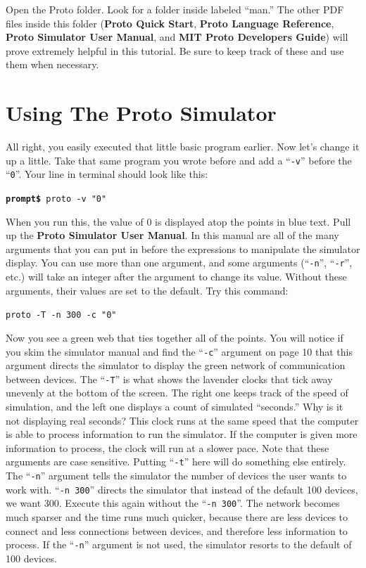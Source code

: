 \documentclass{article}
\newcommand\code[1]{\begin{center}\var{#1}\end{center}}
\newcommand\var[1]{{\tt #1}}
\newcommand\qvar[1]{``{\tt #1}''}
\begin{document}
Open the Proto folder.  Look for a folder inside labeled ``man.''  The
other PDF files inside this folder ({\bf Proto Quick Start}, {\bf
  Proto Language Reference}, {\bf Proto Simulator User Manual}, and
{\bf MIT Proto Developers Guide}) will prove extremely helpful in this
tutorial.  Be sure to keep track of these and use them when necessary.


\section{Using The Proto Simulator}

All right, you easily executed that little basic program earlier.  Now
let's change it up a little.  Take that same program you wrote before
and add a \qvar{-v} before the \qvar{0}.  Your line in terminal should
look like this:

\code{{\bf prompt\$} proto -v "0"}

When you run this, the value of 0 is displayed atop the points in blue
text.  Pull up the {\bf Proto Simulator User Manual}. In this manual
are all of the many arguments that you can put in before the
expressions to manipulate the simulator display.  You can use more
than one argument, and some arguments (\qvar{-n}, \qvar{-r}, etc.) will
take an integer after the argument to change its value.  Without these
arguments, their values are set to the default.  Try this command:

\code{proto -T -n 300 -c "0"}

Now you see a green web that ties together all of the points. You will
notice if you skim the simulator manual and find the \qvar{-c}
argument on page 10 that this argument directs the simulator to
display the green network of communication between devices.  The
\qvar{-T} is what shows the lavender clocks that tick away unevenly at
the bottom of the screen.  The right one keeps track of the speed of
simulation, and the left one displays a count of simulated
``seconds.''  Why is it not displaying real seconds?  This clock runs
at the same speed that the computer is able to process information to
run the simulator.  If the computer is given more information to
process, the clock will run at a slower pace.  Note that these
arguments are case sensitive.  Putting \qvar{-t} here will do
something else entirely.  The \qvar{-n} argument tells the simulator
the number of devices the user wants to work with. \qvar{-n 300}
directs the simulator that instead of the default 100 devices, we want
300.  Execute this again without the \qvar{-n 300}.  The network
becomes much sparser and the time runs much quicker, because there are
less devices to connect and less connections between devices, and
therefore less information to process.  If the \qvar{-n} argument is
not used, the simulator resorts to the default of 100 devices.
\end{document}
